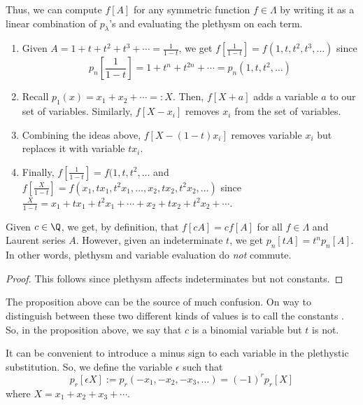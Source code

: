 \documentclass[11pt,leqno,oneside]{amsart}
\numberwithin{thm}{section}
\newcommand{\sym}{\Lambda}
\begin{document}
Thus, we can compute \(f[A]\) for any symmetric function \(f \in
\sym\) by writing it as a linear combination of \(p_\lambda\)'s and
evaluating the plethysm on each term.
\begin{example}
  \begin{enumerate}
  \item Given \(A = 1+t+t^2+t^3+\cdots = \frac{1}{1-t}\), we get
  \(f[\frac{1}{1-t}] = f(1,t,t^2,t^3,\ldots)\) since \[
    p_n\left[\frac{1}{1-t}\right] = 1+t^n+t^{2n}+\cdots =
    p_n(1,t,t^2,\ldots) 
  \]
  \item Recall \(p_1(x) = x_1 + x_2 + \cdots =: X\). Then, \(f[X+a]\) adds a
    variable \(a\) to our set of variables. Similarly, \(f[X-x_i]\)
    removes \(x_i\) from the set of variables.
  \item Combining the ideas above, \(f[X-(1-t)x_i]\) removes
    variable \(x_i\) but replaces it with variable \(tx_i\).
  \item Finally, \(f[\frac{1}{1-t}] = f(1,t,t^2,\ldots\) and
    \(f[\frac{X}{1-t}] = f(x_1,tx_1, t^2x_1, \ldots,x_2,tx_2,
    t^2x_2, \ldots)\) since \(\frac{X}{1-t} = x_1+tx_1+t^2x_1 +
    \cdots + x_2 + tx_2 + t^2 x_2 + \cdots\).
  \end{enumerate}
\end{example}
\begin{prop}
  Given \(c \in \Q\), we get, by definition, that \(f[cA] = cf[A]\)
  for all \(f \in \sym\) and Laurent series \(A\). However, given an
  indeterminate \(t\), we get \(p_n[tA] = t^n p_n[A]\). In other
  words, plethysm and variable evaluation do \emph{not} commute.
\end{prop}
\begin{proof}
  This follows since plethysm affects indeterminates but not
  constants. 
\end{proof}
\begin{rmk}
  The proposition above can be the source of much confusion. On way to
  distinguish between these two different kinds of values is to call
  the constants . So, in the proposition above,
  we say that \(c\) is a binomial variable but \(t\) is not.
\end{rmk}
\begin{defn}
  It can be convenient to introduce a minus sign to each variable in
  the plethystic substitution. So, we define the variable \(\epsilon\)
  such that \[
    p_r[\epsilon X] := p_r(-x_1, -x_2, -x_3, \ldots) = (-1)^r p_r[X]
  \]
  where \(X = x_1 + x_2 + x_3 + \cdots\).
\end{defn}
\end{document}
